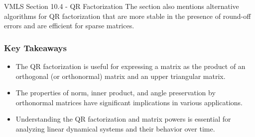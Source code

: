 \begin{notes}{VMLS Section 10.4 - QR Factorization}
    The section also mentions alternative algorithms for QR factorization that are more stable in the presence of round-off errors and are efficient for sparse matrices.
    
    \subsubsection*{Key Takeaways}
    \begin{itemize}
        \item The QR factorization is useful for expressing a matrix as the product of an orthogonal (or orthonormal) matrix and an upper triangular matrix.
        \item The properties of norm, inner product, and angle preservation by orthonormal matrices have significant implications in various applications.
        \item Understanding the QR factorization and matrix powers is essential for analyzing linear dynamical systems and their behavior over time.
    \end{itemize}
\end{notes}